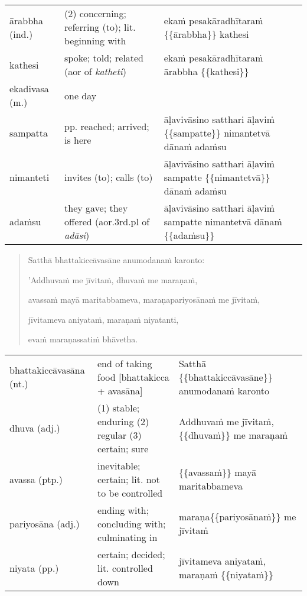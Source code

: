 \documentclass[11pt,oneside]{memoir}
\begin{document}
\begin{longtable}{L{\colOne} L{\colTwo} H}
ārabbha (ind.) & (2) concerning; referring (to); lit. beginning with & ekaṁ pesakāradhītaraṁ \{\{ārabbha\}\} kathesi\\[0pt]
kathesi & spoke; told; related (aor of \emph{katheti}) & ekaṁ pesakāradhītaraṁ ārabbha \{\{kathesi\}\}\\[0pt]
ekadivasa (m.) & one day & \\[0pt]
sampatta & pp. reached; arrived; is here & āḷavivāsino satthari āḷaviṁ \{\{sampatte\}\} nimantetvā dānaṁ adaṁsu\\[0pt]
nimanteti & invites (to); calls (to) & āḷavivāsino satthari āḷaviṁ sampatte \{\{nimantetvā\}\} dānaṁ adaṁsu\\[0pt]
adaṁsu & they gave; they offered (aor.3rd.pl of \emph{adāsi}) & āḷavivāsino satthari āḷaviṁ sampatte nimantetvā dānaṁ \{\{adaṁsu\}\}\\[0pt]
\end{longtable}

\clearpage

\begin{quote}
Satthā bhattakiccāvasāne anumodanaṁ karonto:

'Addhuvaṁ me jīvitaṁ, dhuvaṁ me maraṇaṁ,

avassaṁ mayā maritabbameva, maraṇapariyosānaṁ me jīvitaṁ,

jīvitameva aniyataṁ, maraṇaṁ niyatanti,

evaṁ maraṇassatiṁ bhāvetha.
\end{quote}

\begin{longtable}{L{\colOne} L{\colTwo} H}
bhattakiccāvasāna (nt.) & end of taking food [bhattakicca + avasāna] & Satthā \{\{bhattakiccāvasāne\}\} anumodanaṁ karonto\\[0pt]
dhuva (adj.) & (1) stable; enduring (2) regular (3) certain; sure & Addhuvaṁ me jīvitaṁ, \{\{dhuvaṁ\}\} me maraṇaṁ\\[0pt]
avassa (ptp.) & inevitable; certain; lit. not to be controlled & \{\{avassaṁ\}\} mayā maritabbameva\\[0pt]
pariyosāna (adj.) & ending with; concluding with; culminating in & maraṇa\{\{pariyosānaṁ\}\} me jīvitaṁ\\[0pt]
niyata (pp.) & certain; decided; lit. controlled down & jīvitameva aniyataṁ, maraṇaṁ \{\{niyataṁ\}\}\\[0pt]
\end{longtable}

\clearpage
\end{document}
